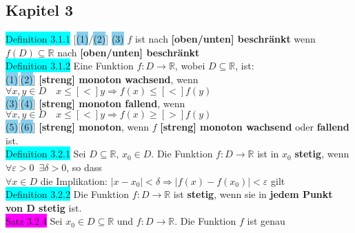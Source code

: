\documentclass[10pt]{article}
\begin{document}
\subsection*{Kapitel 3}
\colorbox{cyan}{Definition 3.1.1} [\colorbox{SkyBlue}{(1)}/\colorbox{SkyBlue}{(2)}]
                \colorbox{SkyBlue}{(3)} $f$ ist nach \textbf{[oben/unten] beschränkt} wenn 
                \textcolor{NavyBlue}{$f(D)\subseteq\mathbb{R}$} 
                nach \textbf{[oben/unten] beschränkt}\\ %
\colorbox{cyan}{Definition 3.1.2} Eine Funktion $f:D\longrightarrow\mathbb{R}$, wobei 
                $D\subseteq\mathbb{R}$, ist:\\
        \indent \colorbox{SkyBlue}{(1)}[\colorbox{SkyBlue}{(2)}] \textbf{[streng] monoton 
                wachsend}, wenn \textcolor{NavyBlue}{
                $\forall x,y\in D\quad x\leqslant [<]y\Rightarrow f(x)\leqslant [<]f(y)$} \\
        \indent \colorbox{SkyBlue}{(3)}[\colorbox{SkyBlue}{(4)}] \textbf{[streng] monoton 
                fallend}, wenn \textcolor{NavyBlue}{
                $\forall x,y\in D\quad x\leqslant [<]y\Rightarrow f(x)\geqslant [>]f(y)$} \\
        \indent \colorbox{SkyBlue}{(5)}[\colorbox{SkyBlue}{(6)}] \textbf{[streng] monoton}, 
                wenn \textcolor{NavyBlue}{$f$} 
                \textbf{[streng] monoton wachsend} oder \textbf{fallend} ist.\\
\colorbox{cyan}{Definition 3.2.1} Sei $D\subseteq\mathbb{R},\,x_0\in D$. 
                Die Funktion \textcolor{NavyBlue}{$f:D\longrightarrow\mathbb{R}$} 
                ist in $x_0$ \textbf{stetig}, 
                wenn \textcolor{NavyBlue}{$\forall\varepsilon>0\enspace\exists\delta>0$}, 
                so dass \\
        \indent \textcolor{NavyBlue}{$\forall x\in D$} die Implikation: 
                \textcolor{NavyBlue}{$|x-x_0|<\delta\Rightarrow|f(x)-f(x_0)|<\varepsilon$} gilt\\
\colorbox{cyan}{Definition 3.2.2} Die Funktion 
                \textcolor{NavyBlue}{$f:D\longrightarrow\mathbb{R}$}
                ist \textbf{stetig}, wenn sie in \textbf{jedem Punkt von D stetig} ist.\\
\colorbox{magenta}{Satz 3.2.4} Sei 
                \textcolor{NavyBlue}{$x_0\in D\subseteq\mathbb{R}$} und 
                \textcolor{NavyBlue}{$f:D\longrightarrow\mathbb{R}$}. 
                Die Funktion \textcolor{NavyBlue}{$f$} ist genau 
\end{document}
